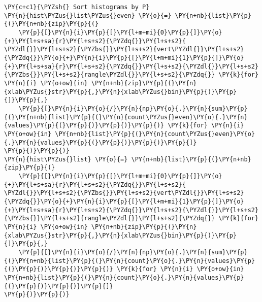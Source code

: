 \begin{tcolorbox}[breakable, size=fbox, boxrule=1pt, pad at break*=1mm,colback=cellbackground, colframe=cellborder]
\begin{Verbatim}[commandchars=\\\{\}]
\PY{c+c1}{\PYZsh{} Sort histograms by P}
\PY{n}{hist\PYZus{}list\PYZus{}even} \PY{o}{=} \PY{n+nb}{list}\PY{p}{(}\PY{n+nb}{zip}\PY{p}{(}
    \PY{p}{[}\PY{n}{i}\PY{p}{[}\PY{l+m+mi}{0}\PY{p}{]}\PY{o}{+}\PY{l+s+sa}{r}\PY{l+s+s2}{\PYZdq{}}\PY{l+s+s2}{ \PYZdl{}}\PY{l+s+s2}{\PYZbs{}}\PY{l+s+s2}{vert\PYZdl{}}\PY{l+s+s2}{\PYZdq{}}\PY{o}{+}\PY{n}{i}\PY{p}{[}\PY{l+m+mi}{1}\PY{p}{]}\PY{o}{+}\PY{l+s+sa}{r}\PY{l+s+s2}{\PYZdq{}}\PY{l+s+s2}{\PYZdl{}}\PY{l+s+s2}{\PYZbs{}}\PY{l+s+s2}{rangle\PYZdl{}}\PY{l+s+s2}{\PYZdq{}} \PY{k}{for} \PY{n}{i} \PY{o+ow}{in} \PY{n+nb}{zip}\PY{p}{(}\PY{n}{xlab\PYZus{}str}\PY{p}{,}\PY{n}{xlab\PYZus{}bin}\PY{p}{)}\PY{p}{]}\PY{p}{,}
    \PY{p}{[}\PY{n}{i}\PY{o}{/}\PY{n}{np}\PY{o}{.}\PY{n}{sum}\PY{p}{(}\PY{n+nb}{list}\PY{p}{(}\PY{n}{count\PYZus{}even}\PY{o}{.}\PY{n}{values}\PY{p}{(}\PY{p}{)}\PY{p}{)}\PY{p}{)} \PY{k}{for} \PY{n}{i} \PY{o+ow}{in} \PY{n+nb}{list}\PY{p}{(}\PY{n}{count\PYZus{}even}\PY{o}{.}\PY{n}{values}\PY{p}{(}\PY{p}{)}\PY{p}{)}\PY{p}{]}
\PY{p}{)}\PY{p}{)}
\PY{n}{hist\PYZus{}list} \PY{o}{=} \PY{n+nb}{list}\PY{p}{(}\PY{n+nb}{zip}\PY{p}{(}
    \PY{p}{[}\PY{n}{i}\PY{p}{[}\PY{l+m+mi}{0}\PY{p}{]}\PY{o}{+}\PY{l+s+sa}{r}\PY{l+s+s2}{\PYZdq{}}\PY{l+s+s2}{ \PYZdl{}}\PY{l+s+s2}{\PYZbs{}}\PY{l+s+s2}{vert\PYZdl{}}\PY{l+s+s2}{\PYZdq{}}\PY{o}{+}\PY{n}{i}\PY{p}{[}\PY{l+m+mi}{1}\PY{p}{]}\PY{o}{+}\PY{l+s+sa}{r}\PY{l+s+s2}{\PYZdq{}}\PY{l+s+s2}{\PYZdl{}}\PY{l+s+s2}{\PYZbs{}}\PY{l+s+s2}{rangle\PYZdl{}}\PY{l+s+s2}{\PYZdq{}} \PY{k}{for} \PY{n}{i} \PY{o+ow}{in} \PY{n+nb}{zip}\PY{p}{(}\PY{n}{xlab\PYZus{}str}\PY{p}{,}\PY{n}{xlab\PYZus{}bin}\PY{p}{)}\PY{p}{]}\PY{p}{,}
    \PY{p}{[}\PY{n}{i}\PY{o}{/}\PY{n}{np}\PY{o}{.}\PY{n}{sum}\PY{p}{(}\PY{n+nb}{list}\PY{p}{(}\PY{n}{count}\PY{o}{.}\PY{n}{values}\PY{p}{(}\PY{p}{)}\PY{p}{)}\PY{p}{)} \PY{k}{for} \PY{n}{i} \PY{o+ow}{in} \PY{n+nb}{list}\PY{p}{(}\PY{n}{count}\PY{o}{.}\PY{n}{values}\PY{p}{(}\PY{p}{)}\PY{p}{)}\PY{p}{]}
\PY{p}{)}\PY{p}{)}
\end{Verbatim}
\end{tcolorbox}

